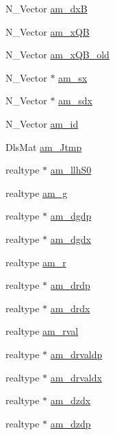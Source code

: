 \begin{DoxyCompactItemize}
N\+\_\+\+Vector \hyperlink{struct_temp_data_a6dc87d123304fe3c6a20899fca777501}{am\+\_\+dx\+B}
\item 
N\+\_\+\+Vector \hyperlink{struct_temp_data_ac4099b4f6bf1f15d7d07b88993515da7}{am\+\_\+x\+Q\+B}
\item 
N\+\_\+\+Vector \hyperlink{struct_temp_data_a132a821ce32c806eb4691a94da216e29}{am\+\_\+x\+Q\+B\+\_\+old}
\item 
N\+\_\+\+Vector $\ast$ \hyperlink{struct_temp_data_a5253085927038bdeb7c327aa14470722}{am\+\_\+sx}
\item 
N\+\_\+\+Vector $\ast$ \hyperlink{struct_temp_data_a2457438c1ae3ea571031bc3c2e440da2}{am\+\_\+sdx}
\item 
N\+\_\+\+Vector \hyperlink{struct_temp_data_ad918917fdce710fbd6fe9774e35bfcfb}{am\+\_\+id}
\item 
Dls\+Mat \hyperlink{struct_temp_data_aa850cd4b6b24d0b98b4aac8f42a057a1}{am\+\_\+\+Jtmp}
\item 
realtype $\ast$ \hyperlink{struct_temp_data_ac8e571186f15f3172f69d2e016023fbc}{am\+\_\+llh\+S0}
\item 
realtype \hyperlink{struct_temp_data_abcec297db6f0e216e479c6f4f2cdb5ff}{am\+\_\+g}
\item 
realtype $\ast$ \hyperlink{struct_temp_data_a081b11391c89402abac604021f6ccf9d}{am\+\_\+dgdp}
\item 
realtype $\ast$ \hyperlink{struct_temp_data_ae858332947a50294436a0bbf2b7a8ea1}{am\+\_\+dgdx}
\item 
realtype \hyperlink{struct_temp_data_a7f00edd52d15fce2def96917a9ee47dc}{am\+\_\+r}
\item 
realtype $\ast$ \hyperlink{struct_temp_data_ab9c815d99f44f36f068133746323b5cc}{am\+\_\+drdp}
\item 
realtype $\ast$ \hyperlink{struct_temp_data_a92cb58d44aef5760bf9ad22690e48113}{am\+\_\+drdx}
\item 
realtype \hyperlink{struct_temp_data_abf2c3d254f311ab4385f18cff8acb89a}{am\+\_\+rval}
\item 
realtype $\ast$ \hyperlink{struct_temp_data_af51ded83b415e8a9d8e4f67736d11d34}{am\+\_\+drvaldp}
\item 
realtype $\ast$ \hyperlink{struct_temp_data_ae474fa93074514dd5b9d6ef00aa7345d}{am\+\_\+drvaldx}
\item 
realtype $\ast$ \hyperlink{struct_temp_data_a9309d8a421155cac9ad1c3fd1b5b0f56}{am\+\_\+dzdx}
\item 
realtype $\ast$ \hyperlink{struct_temp_data_a1df093f48bf98db04c63e845d7b1d58b}{am\+\_\+dzdp}

\end{DoxyCompactItemize}
